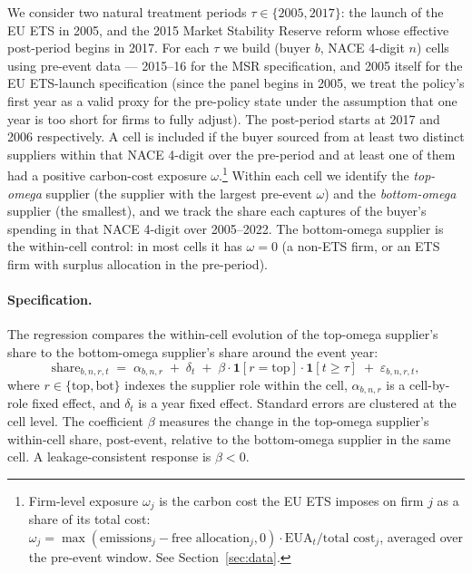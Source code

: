 We consider two natural treatment periods $\tau \in \{2005, 2017\}$: the launch of the EU ETS in 2005, and the 2015 Market Stability Reserve reform whose effective post-period begins in 2017. For each $\tau$ we build (buyer $b$, NACE 4-digit $n$) cells using pre-event data --- 2015--16 for the MSR specification, and 2005 itself for the EU ETS-launch specification (since the panel begins in 2005, we treat the policy's first year as a valid proxy for the pre-policy state under the assumption that one year is too short for firms to fully adjust). The post-period starts at 2017 and 2006 respectively. A cell is included if the buyer sourced from at least two distinct suppliers within that NACE 4-digit over the pre-period and at least one of them had a positive carbon-cost exposure $\omega$.\footnote{Firm-level exposure $\omega_j$ is the carbon cost the EU ETS imposes on firm $j$ as a share of its total cost: $\omega_j = \max(\text{emissions}_j - \text{free allocation}_j, 0) \cdot \text{EUA}_t / \text{total cost}_j$, averaged over the pre-event window. See Section~\ref{sec:data}.} Within each cell we identify the \emph{top-omega} supplier (the supplier with the largest pre-event $\omega$) and the \emph{bottom-omega} supplier (the smallest), and we track the share each captures of the buyer's spending in that NACE 4-digit over 2005--2022. The bottom-omega supplier is the within-cell control: in most cells it has $\omega = 0$ (a non-ETS firm, or an ETS firm with surplus allocation in the pre-period).

\paragraph{Specification.} The regression compares the within-cell evolution of the top-omega supplier's share to the bottom-omega supplier's share around the event year:
\begin{equation}
    \text{share}_{b,n,r,t} \;=\; \alpha_{b,n,r} \;+\; \delta_t \;+\; \beta \cdot \mathbf{1}[r = \text{top}] \cdot \mathbf{1}[t \geq \tau] \;+\; \varepsilon_{b,n,r,t},
    \label{eq:within_intensive}
\end{equation}
where $r \in \{\text{top}, \text{bot}\}$ indexes the supplier role within the cell, $\alpha_{b,n,r}$ is a cell-by-role fixed effect, and $\delta_t$ is a year fixed effect. Standard errors are clustered at the cell level. The coefficient $\beta$ measures the change in the top-omega supplier's within-cell share, post-event, relative to the bottom-omega supplier in the same cell. A leakage-consistent response is $\beta < 0$.

